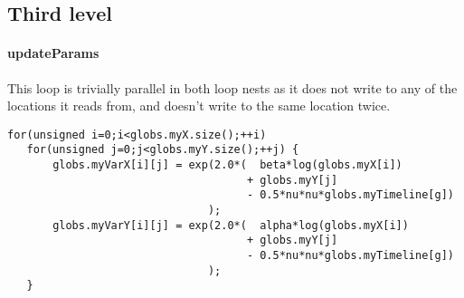 \subsection{Third level}

\paragraph{updateParams}
This loop is trivially parallel in both loop nests as it does not write to any of the locations it reads from, and
 doesn't write to the same location twice.
\begin{lstlisting}[caption=Loop in updateParams(), label=updpar]
for(unsigned i=0;i<globs.myX.size();++i)
   for(unsigned j=0;j<globs.myY.size();++j) {
       globs.myVarX[i][j] = exp(2.0*(  beta*log(globs.myX[i])
                                     + globs.myY[j]
                                     - 0.5*nu*nu*globs.myTimeline[g])
                               );
       globs.myVarY[i][j] = exp(2.0*(  alpha*log(globs.myX[i])
                                     + globs.myY[j]
                                     - 0.5*nu*nu*globs.myTimeline[g])
                               );
   }
\end{lstlisting}

